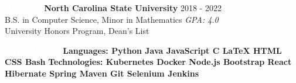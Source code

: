 \documentclass{resume} %
\begin{document}
\setlength\fboxsep{0.33em}

\begin{rSection}{\colorbox{NCSURED}{\textcolor{WHITE}{Education}}}
{\bf North Carolina State University} \hfill {2018 - 2022} \\ 
B.S. in Computer Science, Minor in Mathematics \hfill {\em GPA: 4.0}\\
University Honors Program, Dean's List

\end{rSection}

\begin{rSection}{\colorbox{NCSURED}{\textcolor{WHITE}{Technical Skills}}}
	\textbf{Languages:
		\hspace*{0.275cm}
		{Python} \textbar
		{ Java} \textbar
		{ JavaScript} \textbar
		{ C} \textbar
		{ \LaTeX} \textbar
		{ HTML} \textbar
		{ CSS} \textbar
		{ Bash}
	} \newline
	\textbf{Technologies:
		{Kubernetes} \textbar
		{ Docker} \textbar
		{ Node.js} \textbar
		{ Bootstrap} \textbar
		{ React} \textbar
		{ Hibernate} \textbar
		{ Spring} \textbar
		{ Maven} \newline
		\hspace*{2.625cm}
		{Git} \textbar
		{ Selenium} \textbar
		{ Jenkins}
	}	
\end{rSection}
\end{document}
